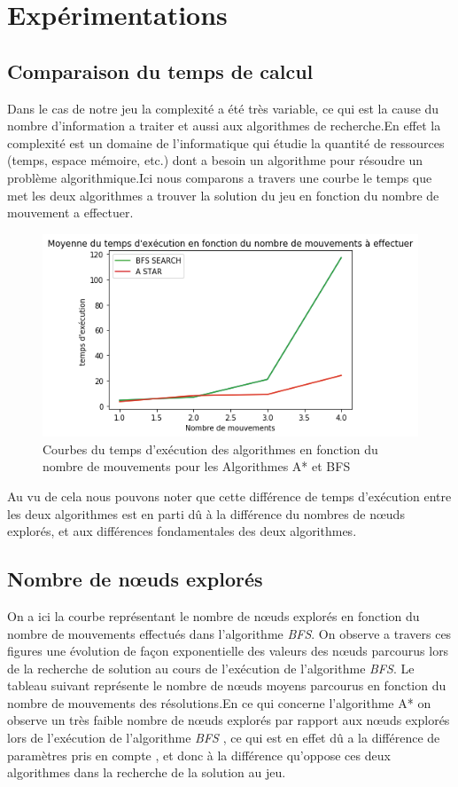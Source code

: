 \documentclass[a4paper]{article} %
\begin{document}
\section{Expérimentations}
	\subsection{Comparaison du temps de calcul}
	
	
Dans le cas de notre jeu la complexité a été très variable, ce qui est la cause du nombre d'information a traiter et aussi aux algorithmes de recherche.En effet  la complexité est un domaine de l'informatique qui étudie la quantité de ressources (temps, espace mémoire, etc.) dont a besoin un algorithme pour résoudre un problème algorithmique.Ici nous comparons a travers une courbe le temps que met les deux algorithmes a trouver la solution du jeu en fonction du nombre de mouvement a effectuer.	
	\begin{figure}[h]
	\begin{center}
	\includegraphics[scale=0.37]{./images/time.png}
	\caption{Courbes du temps d’exécution des algorithmes  en fonction du  nombre de mouvements pour les Algorithmes A* et BFS}
	\end{center}
\end{figure}
\newline
Au vu de cela nous pouvons noter que cette différence de temps d’exécution entre les deux algorithmes est en parti dû  à la différence du  nombres de nœuds explorés, et aux différences fondamentales des deux algorithmes.

	
	\subsection{Nombre de nœuds explorés}
On a ici la courbe représentant le nombre de nœuds explorés en fonction du nombre de mouvements effectués dans l'algorithme \textsl{BFS}. On observe a travers ces figures une évolution de façon exponentielle des valeurs des nœuds parcourus lors de la recherche de solution au cours de l’exécution de l'algorithme \textsl{BFS}. Le tableau suivant représente le nombre de nœuds moyens parcourus en fonction du nombre de mouvements des résolutions.En ce qui concerne l'algorithme A* on observe un très faible nombre de nœuds explorés par rapport aux nœuds explorés lors de l’exécution de l'algorithme \textsl{BFS} , ce qui est en effet dû a la différence de paramètres pris en compte , et donc à la différence qu'oppose ces deux algorithmes dans la recherche de la solution au jeu. 
\end{document}
